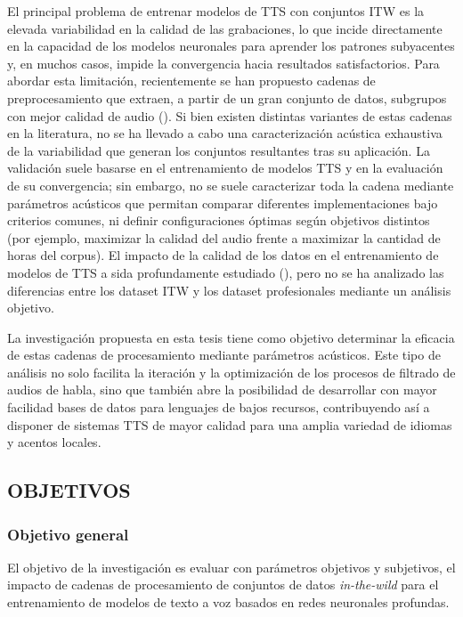 El principal problema de entrenar modelos de TTS con conjuntos ITW es la elevada variabilidad en la calidad de las grabaciones, lo que incide directamente en la capacidad de los modelos neuronales para aprender los patrones subyacentes y, en muchos casos, impide la convergencia hacia resultados satisfactorios. Para abordar esta limitación, recientemente se han propuesto cadenas de preprocesamiento que extraen, a partir de un gran conjunto de datos, subgrupos con mejor calidad de audio (\cite{autoprep}). Si bien existen distintas variantes de estas cadenas en la literatura, no se ha llevado a cabo una caracterización acústica exhaustiva de la variabilidad que generan los conjuntos resultantes tras su aplicación. La validación suele basarse en el entrenamiento de modelos TTS y en la evaluación de su convergencia; sin embargo, no se suele caracterizar toda la cadena mediante parámetros acústicos que permitan comparar diferentes implementaciones bajo criterios comunes, ni definir configuraciones óptimas según objetivos distintos (por ejemplo, maximizar la calidad del audio frente a maximizar la cantidad de horas del corpus). El impacto de la calidad de los datos en el entrenamiento de modelos de TTS a sida profundamente estudiado (\cite{improv_tts2}), pero no se ha analizado las diferencias entre los dataset ITW y los dataset profesionales mediante un análisis objetivo.

La investigación propuesta en esta tesis tiene como objetivo determinar la eficacia de estas cadenas de procesamiento mediante parámetros acústicos. Este tipo de análisis no solo facilita la iteración y la optimización de los procesos de filtrado de audios de habla, sino que también abre la posibilidad de desarrollar con mayor facilidad bases de datos para lenguajes de bajos recursos, contribuyendo así a disponer de sistemas TTS de mayor calidad para una amplia variedad de idiomas y acentos locales.


\subsection{OBJETIVOS}

\subsubsection{Objetivo general}
El objetivo de la investigación es evaluar con parámetros objetivos y subjetivos, el impacto de cadenas de procesamiento de conjuntos de datos \emph{in-the-wild} para el entrenamiento de modelos de texto a voz basados en redes neuronales profundas.

